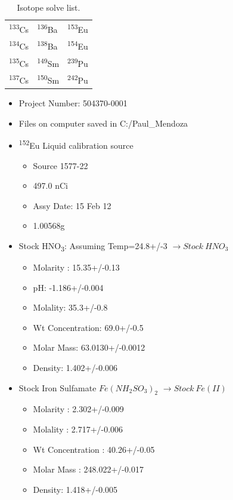 \documentclass[idxtotoc,hyperref,openany,oneside]{labbook} %
\newcommand{\tss}{\textsuperscript}
\newcommand{\tsbs}{\textsubscript}
\begin{document}
\begin{table}[H]
\begin{center}
\begin{tabular}{l l l}
\toprule
\tss{133}Cs & \tss{136}Ba & \tss{153}Eu\\ 
\tss{134}Cs & \tss{138}Ba & \tss{154}Eu\\
\tss{135}Cs & \tss{149}Sm & \tss{239}Pu\\
\tss{137}Cs & \tss{150}Sm & \tss{242}Pu\\
\bottomrule
\end{tabular}
\caption{Isotope solve list.}
\end{center}
\end{table}  


\begin{itemize}
\item{Project Number: 504370-0001}
\item{Files on computer saved in C:/Paul\_Mendoza}
\item{\tss{152}Eu Liquid calibration source}
  \begin{itemize}
  \item{Source 1577-22}
  \item{497.0 nCi}
  \item{Assy Date: 15 Feb 12}
  \item{1.00568g}
  \end{itemize}
\item{Stock HNO\tsbs{3}: Assuming Temp=24.8+/-3 $\rightarrow\boxed{Stock\ HNO_3}$}
  \begin{itemize}
  \item{Molarity : 15.35+/-0.13}
  \item{pH: -1.186+/-0.004}
  \item{Molality: 35.3+/-0.8}
  \item{Wt Concentration: 69.0+/-0.5}
  \item{Molar Mass: 63.0130+/-0.0012}
  \item{Density: 1.402+/-0.006}
  \end{itemize}
\item{Stock Iron Sulfamate $Fe(NH_2SO_3)_2$ $\rightarrow\boxed{Stock\ Fe(II)}$}
  \begin{itemize}
  \item{Molarity : 2.302+/-0.009}
  \item{Molality : 2.717+/-0.006}
  \item{Wt Concentration : 40.26+/-0.05}
  \item{Molar Mass : 248.022+/-0.017}
  \item{Density: 1.418+/-0.005}
  \end{itemize}
\end{itemize}
\end{document}
